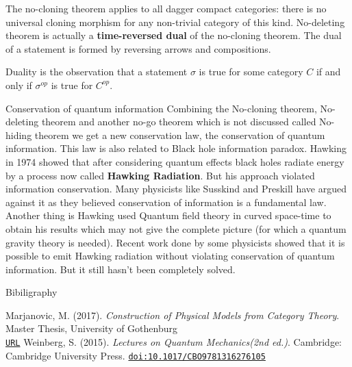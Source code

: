 \documentclass[11pt]{beamer}
\begin{document}
\begin{frame}{}
    The no-cloning theorem applies to all dagger compact categories: there is no universal cloning morphism for any non-trivial category of this kind. No-deleting theorem is actually a \textbf{time-reversed dual} of the no-cloning theorem. The dual of a statement is formed by reversing arrows and compositions.
    
    Duality is the observation that a statement $\sigma$ is true for some category $C$ if and only if $\sigma^{op}$ is true for $C^{op}$.
\end{frame}
\begin{frame}{Conservation of quantum information}
    Combining the No-cloning theorem, No-deleting theorem and another no-go theorem which is not discussed called No-hiding theorem we get a new conservation law, the conservation of quantum information. This law is also related to Black hole information paradox. Hawking in 1974 showed that after considering quantum effects black holes radiate energy by a process now called \textbf{Hawking Radiation}. But his approach violated information conservation. Many physicists like Susskind and Preskill have argued against it as they believed conservation of information is a fundamental law. Another thing is Hawking used Quantum field theory in curved space-time to obtain his results which may not give the complete picture (for which a quantum gravity theory is needed). Recent work done by some physicists showed that it is possible to emit Hawking radiation without violating conservation of quantum information. But it still hasn't been completely solved.
\end{frame}
\begin{frame}{Bibiligraphy}
    \begin{thebibliography}{9}
Marjanovic, M. (2017). 
\textit{Construction of Physical Models from Category Theory}. 
Master Thesis, University of Gothenburg\\
\texttt{\href{http://physics.gu.se/~tfkhj/MastersThesis/Construction_of_Physical_Models_from_Category_Theory.pdf}{URL}}
Weinberg, S. (2015). 
\textit{Lectures on Quantum Mechanics(2nd ed.)}. 
Cambridge: Cambridge University Press. \texttt{\href{https://doi.org/10.1017/CBO9781316276105}{doi:10.1017/CBO9781316276105}}

\end{thebibliography}
\end{frame}
\end{document}

